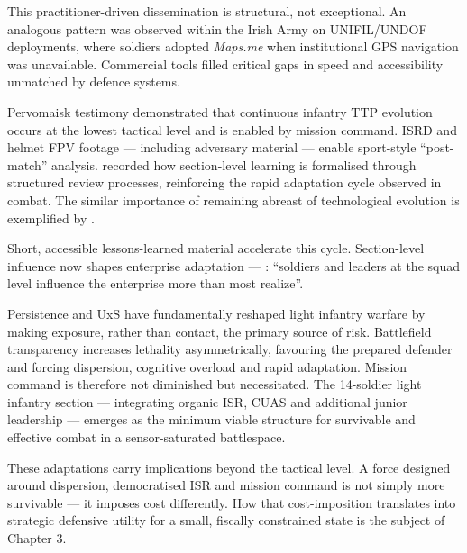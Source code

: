 This practitioner-driven dissemination is structural, not exceptional. An analogous pattern was observed within the Irish Army on UNIFIL/UNDOF deployments, where soldiers adopted \textit{Maps.me} when institutional GPS navigation was unavailable. Commercial tools filled critical gaps in speed and accessibility unmatched by defence systems.

Pervomaisk testimony demonstrated that continuous infantry TTP evolution occurs at the lowest tactical level and is enabled by mission command. ISRD and helmet FPV footage --- including adversary material --- enable sport-style ``post-match'' analysis. \textcite{darragh_participant_4} recorded how section-level learning is formalised through structured review processes, reinforcing the rapid adaptation cycle observed in combat. The similar importance of remaining abreast of technological evolution is exemplified by \textcite[1:02:00--1:04:52]{murray_tuga}.

Short, accessible lessons-learned material accelerate this cycle. Section-level influence now shapes enterprise adaptation --- \textcite{mingus_steppe_2026_03_06_hedgerows_kill_webs}: ``soldiers and leaders at the squad level influence the enterprise more than most realize''. 

Persistence and UxS have fundamentally reshaped light infantry warfare by making exposure, rather than contact, the primary source of risk. Battlefield transparency increases lethality asymmetrically, favouring the prepared defender and forcing dispersion, cognitive overload and rapid adaptation. Mission command is therefore not diminished but necessitated. The 14-soldier light infantry section --- integrating organic ISR, CUAS and additional junior leadership --- emerges as the minimum viable structure for survivable and effective combat in a sensor-saturated battlespace.

These adaptations carry implications beyond the tactical level. A force designed around dispersion, democratised ISR and mission command is not simply more survivable --- it imposes cost differently. How that cost-imposition translates into strategic defensive utility for a small, fiscally constrained state is the subject of Chapter 3.

